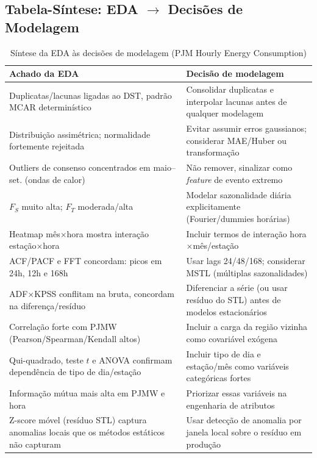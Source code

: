 \documentclass[12pt,a4paper]{article}
\begin{document}
\subsection{Tabela-Síntese: EDA $\rightarrow$ Decisões de Modelagem}

\begin{table}[H]
\centering
\small
\begin{tabular}{p{6.5cm}p{7.5cm}}
\toprule
\textbf{Achado da EDA} & \textbf{Decisão de modelagem} \\
\midrule
Duplicatas/lacunas ligadas ao DST, padrão MCAR determinístico & Consolidar duplicatas e interpolar lacunas antes de qualquer modelagem \\
Distribuição assimétrica; normalidade fortemente rejeitada & Evitar assumir erros gaussianos; considerar MAE/Huber ou transformação \\
Outliers de consenso concentrados em maio--set. (ondas de calor) & Não remover, sinalizar como \emph{feature} de evento extremo \\
$F_S$ muito alta; $F_T$ moderada/alta & Modelar sazonalidade diária explicitamente (Fourier/dummies horárias) \\
Heatmap mês$\times$hora mostra interação estação$\times$hora & Incluir termos de interação hora$\times$mês/estação \\
ACF/PACF e FFT concordam: picos em 24h, 12h e 168h & Usar lags 24/48/168; considerar MSTL (múltiplas sazonalidades) \\
ADF$\times$KPSS conflitam na bruta, concordam na diferença/resíduo & Diferenciar a série (ou usar resíduo do STL) antes de modelos estacionários \\
Correlação forte com PJMW (Pearson/Spearman/Kendall altos) & Incluir a carga da região vizinha como covariável exógena \\
Qui-quadrado, teste $t$ e ANOVA confirmam dependência de tipo de dia/estação & Incluir tipo de dia e estação/mês como variáveis categóricas fortes \\
Informação mútua mais alta em PJMW e hora & Priorizar essas variáveis na engenharia de atributos \\
Z-score móvel (resíduo STL) captura anomalias locais que os métodos estáticos não capturam & Usar detecção de anomalia por janela local sobre o resíduo em produção \\
\bottomrule
\end{tabular}
\caption{Síntese da EDA às decisões de modelagem (PJM Hourly Energy Consumption)}
\end{table}
\end{document}
